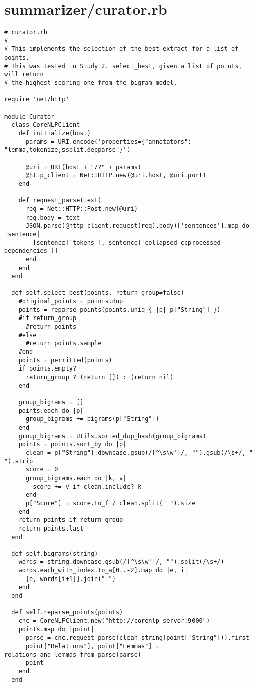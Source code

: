 \documentclass{article}
\begin{document}
\section*{summarizer/curator.rb}
\begin{verbatim}
# curator.rb
#
# This implements the selection of the best extract for a list of points.
# This was tested in Study 2. select_best, given a list of points, will return
# the highest scoring one from the bigram model.

require 'net/http'

module Curator
  class CoreNLPClient
    def initialize(host)
      params = URI.encode('properties={"annotators": "lemma,tokenize,ssplit,depparse"}')

      @uri = URI(host + "/?" + params)
      @http_client = Net::HTTP.new(@uri.host, @uri.port)
    end

    def request_parse(text)
      req = Net::HTTP::Post.new(@uri)
      req.body = text
      JSON.parse(@http_client.request(req).body)['sentences'].map do |sentence|
        [sentence['tokens'], sentence['collapsed-ccprocessed-dependencies']]
      end
    end
  end

  def self.select_best(points, return_group=false)
    #original_points = points.dup
    points = reparse_points(points.uniq { |p| p["String"] })
    #if return_group
      #return points
    #else
      #return points.sample
    #end
    points = permitted(points)
    if points.empty?
      return_group ? (return []) : (return nil)
    end

    group_bigrams = []
    points.each do |p|
      group_bigrams += bigrams(p["String"])
    end
    group_bigrams = Utils.sorted_dup_hash(group_bigrams)
    points = points.sort_by do |p|
      clean = p["String"].downcase.gsub(/[^\s\w']/, "").gsub(/\s+/, " ").strip
      score = 0
      group_bigrams.each do |k, v|
        score += v if clean.include? k
      end
      p["Score"] = score.to_f / clean.split(" ").size
    end
    return points if return_group
    return points.last
  end

  def self.bigrams(string)
    words = string.downcase.gsub(/[^\s\w']/, "").split(/\s+/)
    words.each_with_index.to_a[0..-2].map do |e, i|
      [e, words[i+1]].join(" ")
    end
  end

  def self.reparse_points(points)
    cnc = CoreNLPClient.new("http://corenlp_server:9000")
    points.map do |point|
      parse = cnc.request_parse(clean_string(point["String"])).first
      point["Relations"], point["Lemmas"] = relations_and_lemmas_from_parse(parse)
      point
    end
  end


\end{verbatim}
\end{document}
